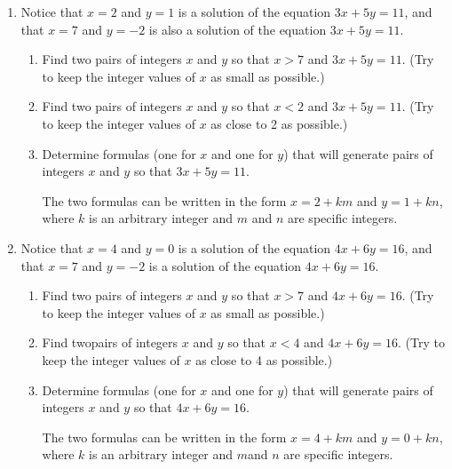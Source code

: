 %
\begin{previewactivity} \label{exploringlinear} \hfill
\begin{enumerate}
\item Notice that $x = 2$ and $y = 1$ is a solution of the equation 
$3x + 5y = 11$, and that $x = 7$ and $y = -2$ is also a solution of the equation 
$3x + 5y = 11$.

\begin{enumerate}
  \item Find two pairs of integers $x$ and $y$ so that $x > 7$ and 
$3x + 5y = 11$.  (Try to keep the integer values of $x$ as small as possible.)

  \item Find two pairs of integers $x$ and $y$ so that $x < 2$ and 
$3x + 5y = 11$.  (Try to keep the integer values of $x$ as close to 2 as possible.)

  \item Determine formulas (one for $x$ and one for $y$)  that will generate pairs of integers $x$ and $y$ so that $3x + 5y = 11$.

\hint  The two formulas can be written in the form $x = 2 + km$ and $y = 1 + kn$, where $k$ is an arbitrary integer and $m$ and $n$ are specific integers. 

\end{enumerate}

\item Notice that $x = 4$ and $y = 0$ is a solution of the equation $4x + 6y = 16$, and that 
$x = 7$ and $y = -2$ is a solution of the equation $4x + 6y = 16$.

\begin{enumerate}
  \item Find two pairs of integers $x$ and $y$ so that $x > 7$ and 
$4x + 6y = 16$.  (Try to keep the integer values of $x$ as small as possible.)

  \item Find twopairs of integers $x$ and $y$ so that $x < 4$ and 
$4x + 6y = 16$.  (Try to keep the integer values of $x$ as close to 4 as possible.)

  \item Determine formulas (one for $x$ and one for $y$)  that will generate pairs of integers $x$ and $y$ so that $4x + 6y = 16$.

\hint  The two formulas can be written in the form $x = 4 + km$ and $y = 0 + kn$, where $k$ is an arbitrary integer and $m$and $n$ are specific integers. 
\end{enumerate}
\end{enumerate}
\end{previewactivity}
\hbreak

\endinput
